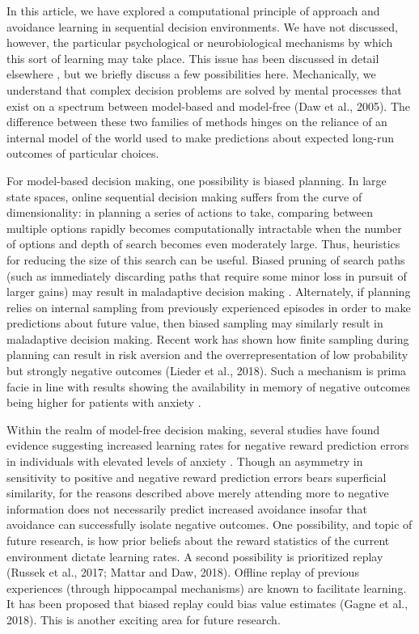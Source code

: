 \documentclass[11pt]{article} %
\begin{document}
In this article, we have explored a computational principle of approach and avoidance learning in sequential decision environments. We have not discussed, however, the particular psychological or neurobiological mechanisms by which this sort of learning may take place. This issue has been discussed in detail elsewhere \citep{Bishop2018}, but we briefly discuss a few possibilities here. Mechanically, we understand that complex decision problems are solved by mental processes that exist on a spectrum between model-based and model-free (Daw et al., 2005). The difference between these two families of methods hinges on the reliance of an internal model of the world used to make predictions about expected long-run outcomes of particular choices.

For model-based decision making, one possibility is biased planning. In large state spaces, online sequential decision making suffers from the curve of dimensionality: in planning a series of actions to take, comparing between multiple options rapidly becomes computationally intractable when the number of options and depth of search becomes even moderately large. Thus, heuristics for reducing the size of this search can be useful. Biased pruning of search paths (such as immediately discarding paths that require some minor loss in pursuit of larger gains) may result in maladaptive decision making \citep{Huys2012}. Alternately, if planning relies on internal sampling from previously experienced episodes in order to make predictions about future value, then biased sampling may similarly result in maladaptive decision making. Recent work has shown how finite sampling during planning can result in risk aversion and the overrepresentation of low probability but strongly negative outcomes (Lieder et al., 2018). Such a mechanism is prima facie in line with results showing the availability in memory of negative outcomes being higher for patients with anxiety \citep{Borkovec1999, Miranda2007}.

Within the realm of model-free decision making, several studies have found evidence suggesting increased learning rates for negative reward prediction errors in individuals with elevated levels of anxiety \citep{Harle2017, Garrett2018}. Though an asymmetry in sensitivity to positive and negative reward prediction errors bears superficial similarity, for the reasons described above merely attending more to negative information does not necessarily predict increased avoidance insofar that avoidance can successfully isolate negative outcomes. One possibility, and topic of future research, is how prior beliefs about the reward statistics of the current environment dictate learning rates. A second possibility is prioritized replay (Russek et al., 2017; Mattar and Daw, 2018). Offline replay of previous experiences (through hippocampal mechanisms) are known to facilitate learning. It has been proposed that biased replay could bias value estimates (Gagne et al., 2018). This is another exciting area for future research.
\end{document}
